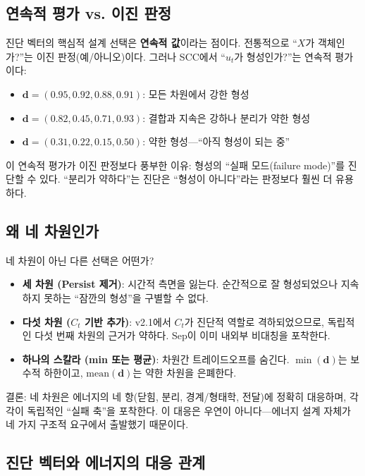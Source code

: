 \subsection{연속적 평가 vs. 이진 판정}

진단 벡터의 핵심적 설계 선택은 \textbf{연속적 값}이라는 점이다. 전통적으로 ``$X$가 객체인가?''는 이진 판정(예/아니오)이다. 그러나 SCC에서 ``$u_t$가 형성인가?''는 연속적 평가이다:

\begin{itemize}
    \item $\mathbf{d} = (0.95, 0.92, 0.88, 0.91)$: 모든 차원에서 강한 형성
    \item $\mathbf{d} = (0.82, 0.45, 0.71, 0.93)$: 결합과 지속은 강하나 분리가 약한 형성
    \item $\mathbf{d} = (0.31, 0.22, 0.15, 0.50)$: 약한 형성---``아직 형성이 되는 중''
\end{itemize}

이 연속적 평가가 이진 판정보다 풍부한 이유: 형성의 ``실패 모드(failure mode)''를 진단할 수 있다. ``분리가 약하다''는 진단은 ``형성이 아니다''라는 판정보다 훨씬 더 유용하다.

\subsection{왜 네 차원인가}

네 차원이 아닌 다른 선택은 어떤가?

\begin{itemize}
    \item \textbf{세 차원 (Persist 제거)}: 시간적 측면을 잃는다. 순간적으로 잘 형성되었으나 지속하지 못하는 ``잠깐의 형성''을 구별할 수 없다.
    \item \textbf{다섯 차원 ($C_t$ 기반 추가)}: v2.1에서 $C_t$가 진단적 역할로 격하되었으므로, 독립적인 다섯 번째 차원의 근거가 약하다. Sep이 이미 내외부 비대칭을 포착한다.
    \item \textbf{하나의 스칼라 (min 또는 평균)}: 차원간 트레이드오프를 숨긴다. $\min(\mathbf{d})$는 보수적 하한이고, $\mathrm{mean}(\mathbf{d})$는 약한 차원을 은폐한다.
\end{itemize}

결론: 네 차원은 에너지의 네 항(닫힘, 분리, 경계/형태학, 전달)에 정확히 대응하며, 각각이 독립적인 ``실패 축''을 포착한다. 이 대응은 우연이 아니다---에너지 설계 자체가 네 가지 구조적 요구에서 출발했기 때문이다.

\subsection{진단 벡터와 에너지의 대응 관계}

